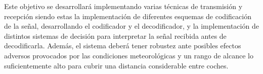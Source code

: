 Este objetivo se desarrollará implementando varias técnicas de transmisión y recepción siendo estas la implementación de 
diferentes esquemas de codificación de la señal, desarrollando el codificador y el decodificador, y la implementación de distintos sistemas de 
decisión para interpretar la señal recibida antes de decodificarla. 
Además, el sistema deberá tener robustez ante posibles
efectos adversos provocados por las condiciones meteorológicas y un rango de
alcance lo suficientemente alto para cubrir una distancia considerable entre coches.

\chapterend
